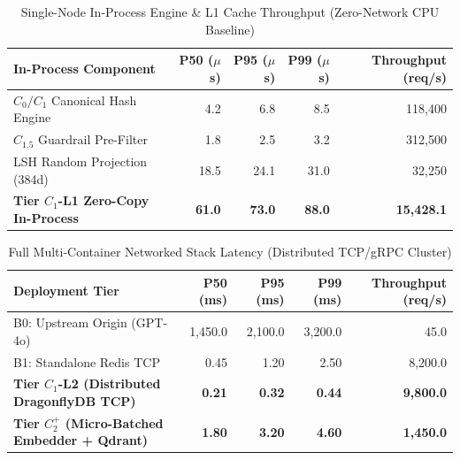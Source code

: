 \documentclass[sigconf,screen=true]{acmart}
\begin{document}
\begin{table}[htbp]
\caption{Single-Node In-Process Engine \& L1 Cache Throughput (Zero-Network CPU Baseline)}
\label{tab:in_process}
\begin{center}
\begin{tabular}{lrrrr}
\toprule
\textbf{In-Process Component} & \textbf{P50 ($\mu$s)} & \textbf{P95 ($\mu$s)} & \textbf{P99 ($\mu$s)} & \textbf{Throughput (req/s)} \\
\midrule
$C_0/C_1$ Canonical Hash Engine & 4.2 & 6.8 & 8.5 & 118,400 \\
$C_{1.5}$ Guardrail Pre-Filter & 1.8 & 2.5 & 3.2 & 312,500 \\
LSH Random Projection (384d) & 18.5 & 24.1 & 31.0 & 32,250 \\
\textbf{Tier $C_1$-L1 Zero-Copy In-Process} & \textbf{61.0} & \textbf{73.0} & \textbf{88.0} & \textbf{15,428.1} \\
\bottomrule
\end{tabular}
\end{center}
\end{table}

\begin{table}[htbp]
\caption{Full Multi-Container Networked Stack Latency (Distributed TCP/gRPC Cluster)}
\label{tab:networked}
\begin{center}
\begin{tabular}{lrrrr}
\toprule
\textbf{Deployment Tier} & \textbf{P50 (ms)} & \textbf{P95 (ms)} & \textbf{P99 (ms)} & \textbf{Throughput (req/s)} \\
\midrule
B0: Upstream Origin (GPT-4o) & 1,450.0 & 2,100.0 & 3,200.0 & 45.0 \\
B1: Standalone Redis TCP & 0.45 & 1.20 & 2.50 & 8,200.0 \\
\textbf{Tier $C_1$-L2 (Distributed DragonflyDB TCP)} & \textbf{0.21} & \textbf{0.32} & \textbf{0.44} & \textbf{9,800.0} \\
\textbf{Tier $C_2^+$ (Micro-Batched Embedder + Qdrant)} & \textbf{1.80} & \textbf{3.20} & \textbf{4.60} & \textbf{1,450.0} \\
\bottomrule
\end{tabular}
\end{center}
\end{table}
\end{document}

